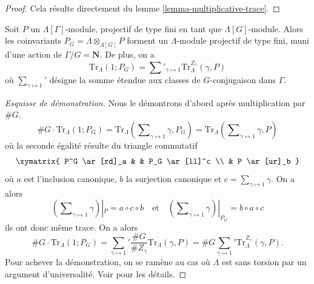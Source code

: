 \begin{proof}
Cela résulte directement du lemme \ref{lemma-multiplicative-trace}.
\end{proof}

\begin{lemma}
\label{lemma-trivial-trace}
Soit $P$ un $\Lambda[\Gamma]$-module, projectif de type fini en tant que
$\Lambda[G]$-module. Alors les coinvariants
$P_G = \Lambda \otimes_{\Lambda[G]} P$
forment un $\Lambda$-module projectif de type fini, muni d'une action de
$\Gamma/G = \mathbf{N}$. De plus, on a
$$
\text{Tr}_\Lambda(1; P_G) =
\sum\nolimits'_{\gamma \mapsto 1} \text{Tr}_\Lambda^{Z_\gamma}(\gamma, P)
$$
où $\sum_{\gamma\mapsto 1}'$ désigne la somme étendue aux classes de $G$-conjugaison
dans $\Gamma$.
\end{lemma}

\begin{proof}[Esquisse de démonstration]
Nous le démontrons d'abord après multiplication par $\# G$.
$$
\# G\cdot \text{Tr}_\Lambda(1; P_G)
= \text{Tr}_\Lambda(\sum\nolimits_{\gamma\mapsto 1} \gamma, P_G)
= \text{Tr}_\Lambda(\sum\nolimits_{\gamma\mapsto 1} \gamma, P)
$$
où la seconde égalité résulte du triangle commutatif
$$
\xymatrix{
P^G \ar[rd]_a & & P_G \ar[ll]^c \\
& P \ar[ur]_b
}
$$
où $a$ est l'inclusion canonique, $b$ la surjection canonique et $c =
\sum_{\gamma \mapsto 1} \gamma$. On a alors
$$
(\sum\nolimits_{\gamma \mapsto 1} \gamma) |_P = a \circ c \circ b
\quad\text{et}\quad
(\sum\nolimits_{\gamma \mapsto 1} \gamma) |_{P_G} = b \circ a \circ c
$$
ils ont donc même trace. On a alors
$$
\# G\cdot \text{Tr}_\Lambda(1; P_G)
=
{\sum_{\gamma\mapsto 1}}'
\frac{\# G}{\# Z_\gamma}\text{Tr}_\Lambda(\gamma, P)
= \# G{\sum_{\gamma\mapsto 1}}' \text{Tr}_\Lambda^{Z_\gamma}(\gamma, P).
$$
Pour achever la démonstration, on se ramène au cas où $\Lambda$ est sans torsion par un
argument d'universalité. Voir \cite{SGA4.5} pour les détails.
\end{proof}

